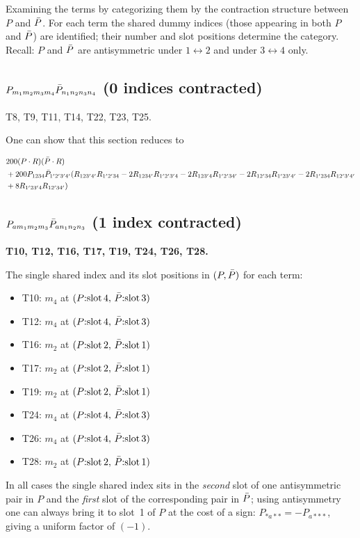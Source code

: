 Examining the terms by categorizing them by the contraction structure between $P$ and $\bar{P}$.
For each term the shared dummy indices (those appearing in both $P$ and $\bar{P}$) are identified;
their number and slot positions determine the category.
Recall: $P$ and $\bar{P}$ are antisymmetric under $1\leftrightarrow 2$ and under $3\leftrightarrow 4$ only.

\subsection{$P_{m_1 m_2 m_3 m_4}\bar{P}_{n_1 n_2 n_3 n_4}$ (0 indices contracted)}

T8, T9, T11, T14, T22, T23, T25.

One can show that this section reduces to 

\begin{align}
&200 (P \cdot R)(\bar{P} \cdot R)\\
&+ 200 P_{1234}\bar{P}_{1'2'3'4'}
(R_{123'4'}R_{1'2'34}
-2R_{1234'}R_{1'2'3'4}
-2R_{123'4}R_{1'2'34'}
-2R_{12'34}R_{1'23'4'}
-2R_{1'234}R_{12'3'4'}\\
&+8R_{1'23'4}R_{12'34'})
\end{align}


\subsection{$P_{a m_1 m_2 m_3}\bar{P}_{a n_1 n_2 n_3}$ (1 index contracted)}

\textbf{T10, T12, T16, T17, T19, T24, T26, T28.}

The single shared index and its slot positions in $(P, \bar{P})$ for each term:
\begin{itemize}
  \item T10: $m_4$ at $(P\text{:slot\,4},\,\bar{P}\text{:slot\,3})$
  \item T12: $m_4$ at $(P\text{:slot\,4},\,\bar{P}\text{:slot\,3})$
  \item T16: $m_2$ at $(P\text{:slot\,2},\,\bar{P}\text{:slot\,1})$
  \item T17: $m_2$ at $(P\text{:slot\,2},\,\bar{P}\text{:slot\,1})$
  \item T19: $m_2$ at $(P\text{:slot\,2},\,\bar{P}\text{:slot\,1})$
  \item T24: $m_4$ at $(P\text{:slot\,4},\,\bar{P}\text{:slot\,3})$
  \item T26: $m_4$ at $(P\text{:slot\,4},\,\bar{P}\text{:slot\,3})$
  \item T28: $m_2$ at $(P\text{:slot\,2},\,\bar{P}\text{:slot\,1})$
\end{itemize}
In all cases the single shared index sits in the \emph{second} slot of one antisymmetric pair
in $P$ and the \emph{first} slot of the corresponding pair in $\bar{P}$; using antisymmetry
one can always bring it to slot~1 of $P$ at the cost of a sign:
$P_{*a**} = -P_{a***}$, giving a uniform factor of $(-1)$.


